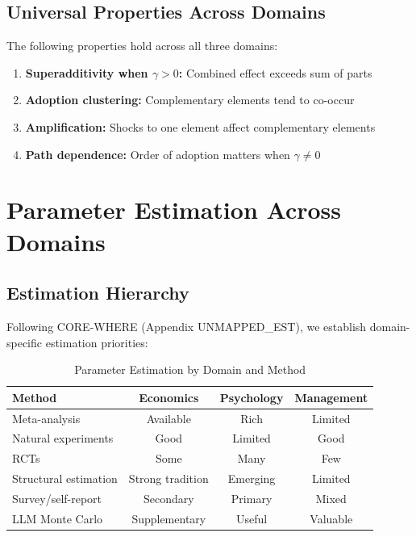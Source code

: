 \subsection{Universal Properties Across Domains}

\begin{theorem}
The following properties hold across all three domains:
\begin{enumerate}
    \item \textbf{Superadditivity when $\gamma > 0$:} Combined effect exceeds sum of parts
    \item \textbf{Adoption clustering:} Complementary elements tend to co-occur
    \item \textbf{Amplification:} Shocks to one element affect complementary elements
    \item \textbf{Path dependence:} Order of adoption matters when $\gamma \neq 0$
\end{enumerate}
\end{theorem}

\section{Parameter Estimation Across Domains}
\label{sec:parameters}

\subsection{Estimation Hierarchy}

Following CORE-WHERE (Appendix UNMAPPED_EST), we establish domain-specific estimation priorities:

\begin{table}[h]
\centering
\caption{Parameter Estimation by Domain and Method}
\label{tab:estimation}
\renewcommand{\arraystretch}{1.3}
\small
\begin{tabular}{@{}lccc@{}}
\toprule
\textbf{Method} & \textbf{Economics} & \textbf{Psychology} & \textbf{Management} \\
\midrule
Meta-analysis & Available & Rich & Limited \\
Natural experiments & Good & Limited & Good \\
RCTs & Some & Many & Few \\
Structural estimation & Strong tradition & Emerging & Limited \\
Survey/self-report & Secondary & Primary & Mixed \\
LLM Monte Carlo & Supplementary & Useful & Valuable \\
\bottomrule
\end{tabular}
\end{table}

